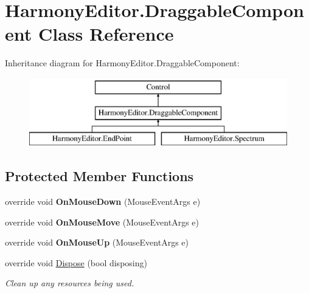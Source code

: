 \hypertarget{class_harmony_editor_1_1_draggable_component}{\section{Harmony\+Editor.\+Draggable\+Component Class Reference}
\label{class_harmony_editor_1_1_draggable_component}
}
Inheritance diagram for Harmony\+Editor.\+Draggable\+Component\+:\begin{figure}[H]
\begin{center}
\leavevmode
\includegraphics[height=3.000000cm]{class_harmony_editor_1_1_draggable_component}
\end{center}
\end{figure}
\subsection*{Protected Member Functions}
\begin{DoxyCompactItemize}
\item 
\hypertarget{class_harmony_editor_1_1_draggable_component_ae2ba64093df9694d6e00079865700990}{override void {\bfseries On\+Mouse\+Down} (Mouse\+Event\+Args e)}\label{class_harmony_editor_1_1_draggable_component_ae2ba64093df9694d6e00079865700990}

\item 
\hypertarget{class_harmony_editor_1_1_draggable_component_aa923ef4da4c16938c9ff8a17dc48bdef}{override void {\bfseries On\+Mouse\+Move} (Mouse\+Event\+Args e)}\label{class_harmony_editor_1_1_draggable_component_aa923ef4da4c16938c9ff8a17dc48bdef}

\item 
\hypertarget{class_harmony_editor_1_1_draggable_component_a346b8728cf21f558414a8a08593ccc76}{override void {\bfseries On\+Mouse\+Up} (Mouse\+Event\+Args e)}\label{class_harmony_editor_1_1_draggable_component_a346b8728cf21f558414a8a08593ccc76}

\item 
override void \hyperlink{class_harmony_editor_1_1_draggable_component_ae8db8c1a141eb59a081904bc7a7d1cfe}{Dispose} (bool disposing)
\begin{DoxyCompactList}\small\item\em Clean up any resources being used. \end{DoxyCompactList}\end{DoxyCompactItemize}
